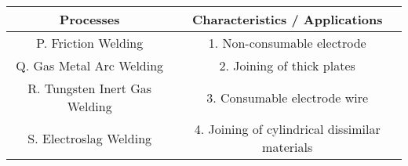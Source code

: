 \begin{tabular}[12pt]{ |c| c|}
    \hline
    \textbf{Processes} & \textbf{Characteristics / Applications} \\ 
    \hline
    P. Friction Welding & 1. Non-consumable electrode  \\
    \hline 
    Q. Gas Metal Arc Welding & 2. Joining of thick plates \\
    \hline
    R. Tungsten Inert Gas Welding & 3. Consumable electrode wire \\
    \hline
    S. Electroslag Welding & 4. Joining of cylindrical dissimilar materials \\
    \hline
    \end{tabular}
